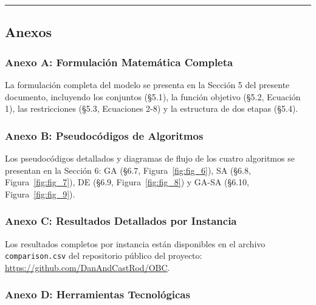 \documentclass[
  spanish,
  12pt,
]{article}
\begin{document}
\begin{center}\rule{0.5\linewidth}{0.5pt}\end{center}

\subsection{Anexos}\label{anexos}

\subsubsection{Anexo A: Formulación Matemática
Completa}\label{anexo-a-formulaciuxf3n-matemuxe1tica-completa}

La formulación completa del modelo se presenta en la Sección 5 del
presente documento, incluyendo los conjuntos (§5.1), la función objetivo
(§5.2, Ecuación 1), las restricciones (§5.3, Ecuaciones 2-8) y la
estructura de dos etapas (§5.4).

\subsubsection{Anexo B: Pseudocódigos de
Algoritmos}\label{anexo-b-pseudocuxf3digos-de-algoritmos}

Los pseudocódigos detallados y diagramas de flujo de los cuatro
algoritmos se presentan en la Sección 6: GA (§6.7,
Figura~\ref{fig:fig_6}), SA (§6.8, Figura~\ref{fig:fig_7}), DE (§6.9,
Figura~\ref{fig:fig_8}) y GA-SA (§6.10, Figura~\ref{fig:fig_9}).

\subsubsection{Anexo C: Resultados Detallados por
Instancia}\label{anexo-c-resultados-detallados-por-instancia}

Los resultados completos por instancia están disponibles en el archivo
\texttt{comparison.csv} del repositorio público del proyecto:
\url{https://github.com/DanAndCastRod/OBC}.

\subsubsection{Anexo D: Herramientas
Tecnológicas}\label{anexo-d-herramientas-tecnoluxf3gicas}
\end{document}
